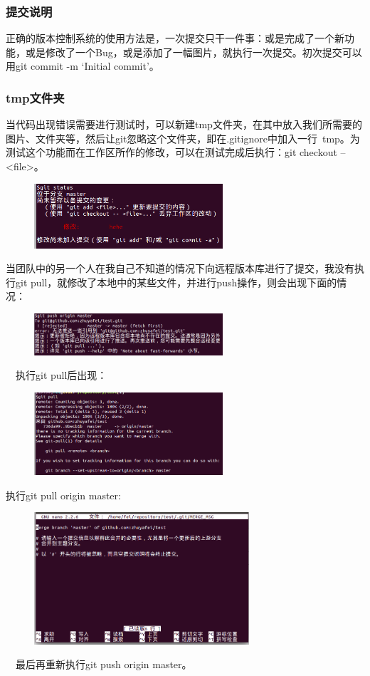 \documentclass[notheorems,mathserif,table,compress]{beamer}  %
\begin{document}
\begin{frame}
  \frametitle{提交说明}
  正确的版本控制系统的使用方法是，一次提交只干一件事：或是完成了一个新功能，或是修改了一个Bug，或是添加了一幅图片，就执行一次提交。初次提交可以用git commit -m `Initial commit'。
\end{frame}


\begin{frame}
  \frametitle{tmp文件夹}
  当代码出现错误需要进行测试时，可以新建tmp文件夹，在其中放入我们所需要的图片、文件夹等，然后让git忽略这个文件夹，即在.gitignore中加入一行~tmp。为测试这个功能而在工作区所作的修改，可以在测试完成后执行：git checkout -- <file>。
　　\begin{figure}[h]
  \centering
  \centerline{\includegraphics[width=7cm]{44.png}}
  \end{figure}
\end{frame}


\begin{frame}
  当团队中的另一个人在我自己不知道的情况下向远程版本库进行了提交，我没有执行git pull，就修改了本地中的某些文件，并进行push操作，则会出现下面的情况：
　　\begin{figure}[h]
  \centering
  \centerline{\includegraphics[width=7cm]{11.png}}
  \end{figure}
　执行git pull后出现：
　　\begin{figure}[h]
  \centering
  \centerline{\includegraphics[width=7cm]{22.png}}
  \end{figure}
\end{frame}


\begin{frame}
  执行git pull origin master:
　　\begin{figure}[h]
  \centering
  \centerline{\includegraphics[width=8cm]{33.png}}
  \end{figure}
　最后再重新执行git push origin master。
\end{frame}
\end{document}
